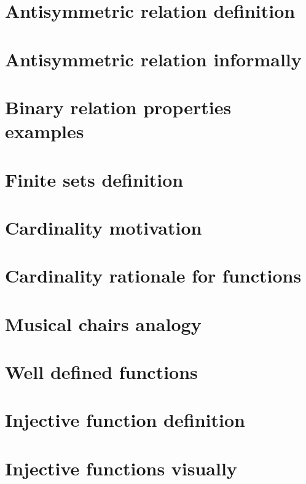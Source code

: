 \section*{Antisymmetric relation definition}

\vfill
\section*{Antisymmetric relation informally}

\vfill
\section*{Binary relation properties examples}

\vfill
\section*{Finite sets definition}

\vfill
\section*{Cardinality motivation}

\vfill
\section*{Cardinality rationale for functions}

\vfill
\section*{Musical chairs analogy}

\vfill
\section*{Well defined functions}

\vfill
\section*{Injective function definition}

\vfill
\section*{Injective functions visually}

\vfill
